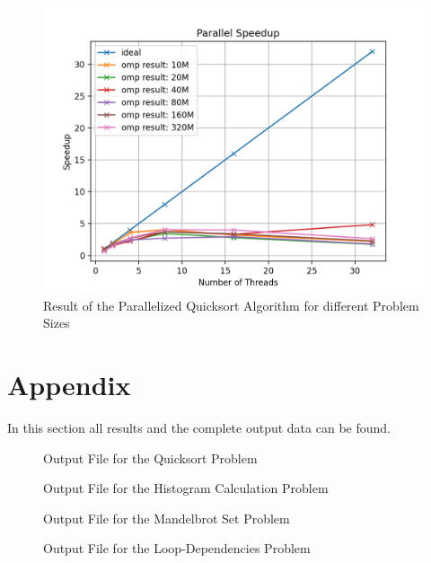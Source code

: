 \documentclass[unicode,11pt,a4paper,oneside,numbers=endperiod,openany]{scrartcl}
\begin{document}
\begin{figure}[H]
  \centering
  \includegraphics[width=\textwidth]{Images_Output/qicksort_tot_plot.png}
  \caption{Result of the Parallelized Quicksort Algorithm for different Problem Sizes}
  \label{fig:quicksort}
\end{figure}

\newpage
\section{Appendix}%
In this section all results and the complete output data can be found.
\begin{figure}[H]
  \centering
  {\fontsize{8}{10}\selectfont
  }
  \caption{Output File for the Quicksort Problem}
  \label{fig:output_quicksort}
\end{figure}

\begin{figure}[H]
  \centering
  {\fontsize{8}{10}\selectfont
  }
  \caption{Output File for the Histogram Calculation Problem}
  \label{fig:output_hist}
\end{figure}

\begin{figure}[H]
  \centering
  {\fontsize{8}{10}\selectfont
  }
  \caption{Output File for the Mandelbrot Set Problem}
  \label{fig:output_mandel}
\end{figure}

\begin{figure}[H]
  \centering
  {\fontsize{8}{10}\selectfont
  }
  \caption{Output File for the Loop-Dependencies Problem}
  \label{fig:output_l-d}
\end{figure}

\newpage



\end{document}
